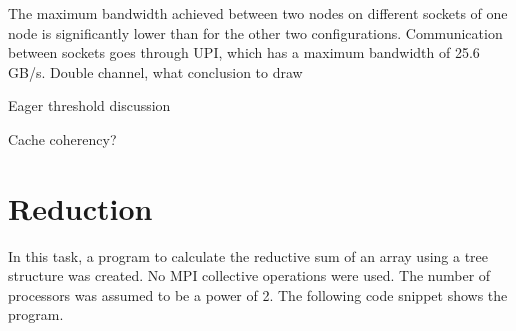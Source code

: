 The maximum bandwidth achieved between two nodes on different sockets of one node is significantly lower than for the other two configurations. Communication between sockets goes through UPI, which has a maximum bandwidth of 25.6 GB/s. Double channel, what conclusion to draw

Eager threshold discussion

Cache coherency?











\section{Reduction}

In this task, a program to calculate the reductive sum of an array using a tree structure was created. No MPI collective operations were used. The number of processors was assumed to be a power of 2. The following code snippet shows the program.


